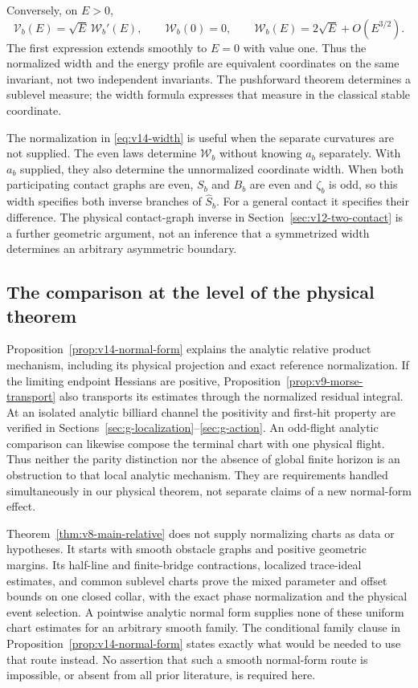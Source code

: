 Conversely, on $E>0$,
\begin{equation}\label{eq:v15-width-equivalence}
 \mathcal V_b(E)=\sqrt E\,\mathcal W_b'(E),\qquad
 \mathcal W_b(0)=0,\qquad
 \mathcal W_b(E)=2\sqrt E+O(E^{3/2}).
\end{equation}
The first expression extends smoothly to $E=0$ with value one.
Thus the normalized width and the energy profile are equivalent
coordinates on the same invariant, not two independent invariants.
The pushforward theorem determines a sublevel measure; the width
formula expresses that measure in the classical stable coordinate.

The normalization in \eqref{eq:v14-width} is useful when the separate
curvatures are not supplied. The even laws determine $\mathcal W_b$
without knowing $a_b$ separately. With $a_b$ supplied, they also
determine the unnormalized coordinate width. When both participating contact graphs are even,
$S_b$ and $B_b$ are even and $\zeta_b$ is odd, so this width specifies
both inverse branches of $\widehat S_b$. For a general contact it
specifies their difference. The physical contact-graph inverse in
Section~\ref{sec:v12-two-contact} is a further geometric argument,
not an inference that a symmetrized width determines an arbitrary
asymmetric boundary.

\subsection{The comparison at the level of the physical theorem}
Proposition~\ref{prop:v14-normal-form} explains the analytic relative
product mechanism, including its physical projection and exact
reference normalization. If the limiting endpoint Hessians are
positive, Proposition~\ref{prop:v9-morse-transport} also transports
its estimates through the normalized residual integral. At an isolated
analytic billiard channel the positivity and first-hit property are
verified in Sections~\ref{sec:g-localization}--\ref{sec:g-action}.
An odd-flight analytic comparison can likewise compose the terminal
chart with one physical flight. Thus neither the parity distinction nor
the absence of global finite horizon is an obstruction to that local
analytic mechanism. They are requirements handled simultaneously in
our physical theorem, not separate claims of a new normal-form effect.

Theorem~\ref{thm:v8-main-relative} does not supply normalizing charts
as data or hypotheses. It starts with smooth obstacle graphs and
positive geometric margins. Its half-line and finite-bridge
contractions, localized trace-ideal estimates, and common sublevel
charts prove the mixed parameter and offset bounds on one closed
collar, with the exact phase normalization and the physical event
selection. A pointwise analytic normal form supplies none of these
uniform chart estimates for an arbitrary smooth family. The conditional
family clause in Proposition~\ref{prop:v14-normal-form} states exactly
what would be needed to use that route instead. No assertion that such
a smooth normal-form route is impossible, or absent from all prior
literature, is required here.

